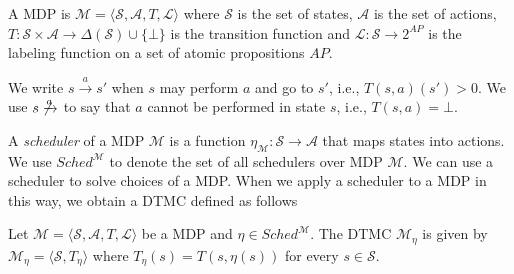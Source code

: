 \begin{definition}[\ac{MDP}]
A \ac{MDP} is $\mathcal{M} = \langle \mathcal{S}, \mathcal{A}, T,\mathscr{L} \rangle$
where $\mathcal{S}$ is the set of states, $\mathcal{A}$ is the set of actions, $T : \mathcal{S} \times \mathcal{A} \rightarrow \Delta(\mathcal{S}) \cup \{\bot\}$ is the transition function and $\mathscr{L} : \mathcal{S} \rightarrow 2^{AP} $ is the labeling function on a set of atomic propositions $AP$.
\end{definition}

We write $s \xrightarrow{a} s'$ when $s$ may perform  $a$ and go to $s'$, i.e., $T(s,a)(s') > 0$. 
We use $s \not\xrightarrow{a}$ to say that  $a$ cannot be performed in state $s$, i.e., $T(s,a) = \bot$.

A \emph{scheduler} of a \ac{MDP} $\mathcal{M}$ is a function $\eta_\mathcal{M} : \mathcal{S} \rightarrow \mathcal{A}$ that maps states into actions. We use $Sched^\mathcal{M}$  to denote the set of all schedulers over \ac{MDP} $\mathcal{M}$.
We can use a scheduler to solve choices of a \ac{MDP}. When we apply a scheduler to a \ac{MDP} in this way, we obtain a \ac{DTMC} defined as follows
\begin{definition}
Let $\mathcal{M} = \langle \mathcal{S}, \mathcal{A}, T, \mathscr{L} \rangle$ be a \ac{MDP} and $\eta \in Sched^\mathcal{M}$. The \ac{DTMC} $\mathcal{M}_\eta$ is given by $ \mathcal{M}_\eta = \langle \mathcal{S}, T_\eta \rangle $
where $T_\eta(s) = T(s,\eta(s))$ for every $s \in \mathcal{S}$.
\end{definition}

